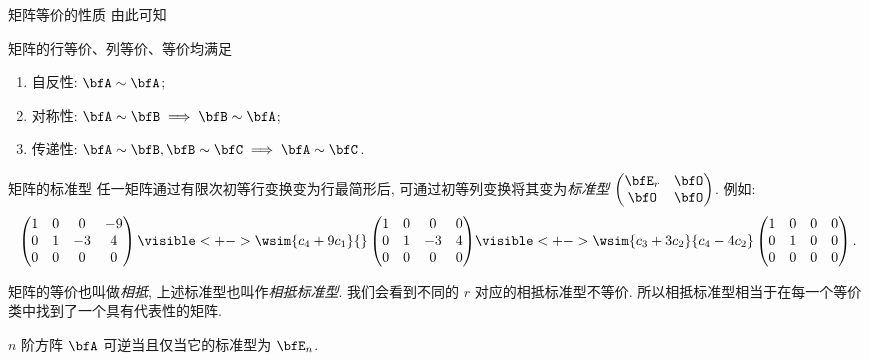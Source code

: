 \begin{frame}{矩阵等价的性质}
	\onslide<+->
	由此可知
	\begin{proposition}
		矩阵的行等价、列等价、等价均满足
		\begin{enumerate}
			\item 自反性: $\bfA\sim\bfA$;
			\item 对称性: $\bfA\sim\bfB\implies\bfB\sim\bfA$;
			\item 传递性: $\bfA\sim\bfB,\bfB\sim\bfC\implies\bfA\sim\bfC$.
		\end{enumerate}
	\end{proposition}
\end{frame}


\begin{frame}{矩阵的标准型}
	\onslide<+->
	任一矩阵通过有限次初等行变换变为行最简形后, 可通过初等\alert{列变换}将其变为\emph{标准型} $\begin{pmatrix}
		\bfE_r&\bfO\\\bfO&\bfO
	\end{pmatrix}$.
	\onslide<+->
	例如:
	\[\begin{pmatrix}
		1&0&0&-9\\
		0&1&-3&4\\
		0&0&0&0
	\end{pmatrix}\visible<+->{\wsim{c_4+9c_1}{}\begin{pmatrix}
		1&0&0&0\\
		0&1&-3&4\\
		0&0&0&0
	\end{pmatrix}}
	\visible<+->{\wsim{c_3+3c_2}{c_4-4c_2}\begin{pmatrix}
		1&0&0&0\\
		0&1&0&0\\
		0&0&0&0
	\end{pmatrix}.}\]
	\vspace{-\baselineskip}

	\onslide<+->
	矩阵的等价也叫做\emph{相抵}, 上述标准型也叫作\emph{相抵标准型}.
	\onslide<+->
	我们会看到不同的 $r$ 对应的相抵标准型不等价.
	\onslide<+->
	所以相抵标准型相当于在每一个等价类中找到了一个具有代表性的矩阵.

	\onslide<+->
	\begin{proposition}
		$n$ 阶方阵 $\bfA$ 可逆当且仅当它的标准型为 $\bfE_n$.
	\end{proposition}
\end{frame}


